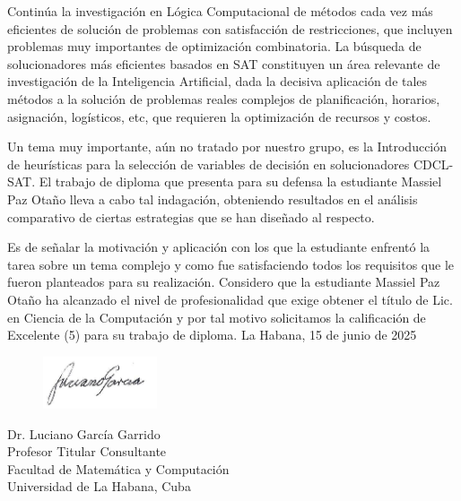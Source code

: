\begin{opinion}
Contin\'ua la investigaci\'on en Lógica Computacional de métodos cada vez más eficientes de solución de problemas con satisfacción de restricciones, que incluyen problemas muy importantes de optimización combinatoria. La búsqueda de solucionadores más eficientes  basados en SAT constituyen un área relevante de investigación de la Inteligencia Artificial, dada la decisiva aplicación de tales métodos a la solución de problemas reales complejos de planificación, horarios, asignación, logísticos, etc, que requieren la optimización de recursos y costos.

Un tema muy importante, aún no tratado por nuestro grupo, es la Introducción de heurísticas para la selección de variables de decisión en solucionadores CDCL-SAT. El trabajo de diploma que presenta para su defensa la estudiante Massiel Paz Otaño lleva a cabo tal indagación, obteniendo resultados en el análisis comparativo de ciertas estrategias que se han diseñado al respecto.

Es de se\~nalar la motivación y aplicación con los que la estudiante enfrentó la tarea sobre un tema complejo y como fue satisfaciendo todos los requisitos que le fueron planteados para su realización. Considero que la estudiante Massiel Paz Otaño ha alcanzado el nivel de profesionalidad que exige obtener el título de Lic. en Ciencia de la Computación y por tal motivo solicitamos la calificación de Excelente (5) para su trabajo de diploma.
La Habana, 15 de junio de 2025

\begin{figure}[ht]
    \includegraphics[width=0.3\textwidth]{Graphics/picture1.png}
\end{figure}

Dr. Luciano García Garrido\\
Profesor Titular Consultante\\
Facultad de Matemática y Computación\\
Universidad de La Habana, Cuba

\end{opinion}

